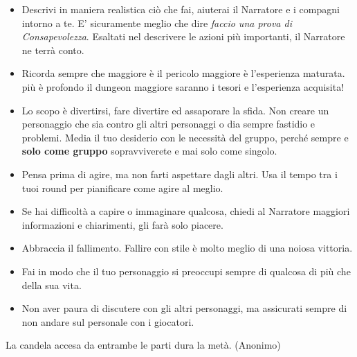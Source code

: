 \begin{multicols}{2}
\begin{itemize}[leftmargin=*]
\item
Descrivi in maniera realistica ciò che fai, aiuterai il Narratore e i compagni intorno a te. E' sicuramente meglio che dire \emph{faccio una prova di Consapevolezza}. Esaltati nel descrivere le azioni più importanti, il Narratore ne terrà conto.


\item
Ricorda sempre che maggiore è il pericolo maggiore è l'esperienza maturata. più è profondo il dungeon maggiore saranno i tesori e l'esperienza acquisita!

\item
Lo scopo è divertirsi, fare divertire ed assaporare la sfida. Non creare un personaggio che sia contro gli altri personaggi o dia sempre fastidio e problemi. Media il tuo desiderio con le necessità del gruppo, perché sempre e \textbf{solo come gruppo} sopravviverete e mai solo come singolo.

\item
Pensa prima di agire, ma non farti aspettare dagli altri. Usa il tempo tra i tuoi round per pianificare come agire al meglio.

\item
Se hai difficoltà a capire o immaginare qualcosa, chiedi al Narratore maggiori informazioni e chiarimenti, gli farà solo piacere.

\item
Abbraccia il fallimento. Fallire con stile è molto meglio di una noiosa vittoria.

\item
Fai in modo che il tuo personaggio si preoccupi sempre di qualcosa di più che della sua vita.

\item
Non aver paura di discutere con gli altri personaggi, ma assicurati sempre di non andare sul personale con i giocatori.

\end{itemize}

\end{multicols}

\vfill

\begin{changemargin}{0.3cm}{0.3cm}\begin{enfasi}{
\begin{center}
La candela accesa da entrambe le parti dura la metà. (Anonimo)
\end{center}
}\end{enfasi}\end{changemargin}

